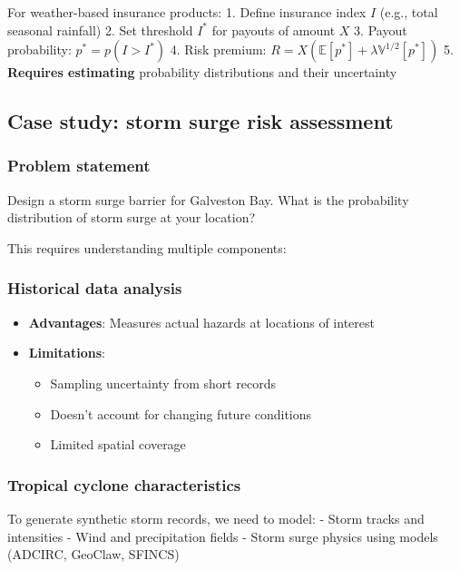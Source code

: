 \documentclass[
  letterpaper,
  DIV=11,
  numbers=noendperiod]{scrreprt}
\providecommand{\tightlist}{%
  \setlength{\itemsep}{0pt}\setlength{\parskip}{0pt}}
\begin{document}
For weather-based insurance products: 1. Define insurance index \(I\)
(e.g., total seasonal rainfall) 2. Set threshold \(I^*\) for payouts of
amount \(X\) 3. Payout probability: \(p^* = p(I > I^*)\) 4. Risk
premium:
\(R = X \left( \mathbb{E}[p^*] + \lambda \mathbb{V}^{1/2}[p^*] \right)\)
5. \textbf{Requires estimating} probability distributions and their
uncertainty

\subsection{Case study: storm surge risk
assessment}\label{case-study-storm-surge-risk-assessment}

\subsubsection{Problem statement}\label{problem-statement}

Design a storm surge barrier for Galveston Bay. What is the probability
distribution of storm surge at your location?

This requires understanding multiple components:

\subsubsection{Historical data analysis}\label{historical-data-analysis}

\begin{itemize}
\tightlist
\item
  \textbf{Advantages}: Measures actual hazards at locations of interest
\item
  \textbf{Limitations}:

  \begin{itemize}
  \tightlist
  \item
    Sampling uncertainty from short records
  \item
    Doesn't account for changing future conditions
  \item
    Limited spatial coverage
  \end{itemize}
\end{itemize}

\subsubsection{Tropical cyclone
characteristics}\label{tropical-cyclone-characteristics}

To generate synthetic storm records, we need to model: - Storm tracks
and intensities - Wind and precipitation fields - Storm surge physics
using models (ADCIRC, GeoClaw, SFINCS)
\end{document}
